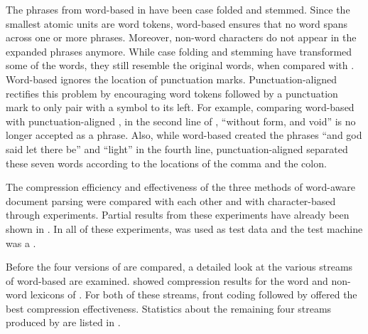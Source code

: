 The phrases from word-based \repair in 
 have been case folded and 
stemmed.  Since the smallest atomic units are word tokens, word-based
\repair ensures that no word spans across one or more phrases.
Moreover, non-word characters do not appear in 
the expanded phrases anymore.  While case folding and stemming have 
transformed some of the words, they still resemble the original words,
when compared with .  Word-based
\repair ignores the location of punctuation marks.  Punctuation-aligned
\repair rectifies this problem by encouraging word tokens followed by a
punctuation mark to only pair with a symbol to its left.
For example, comparing word-based \repair with punctuation-aligned 
\repair, in the second line of ,
``without form, and void'' is no longer accepted as a phrase.  Also,
while word-based \repair created the phrases ``and god said let there be''
and ``light'' in the fourth line, punctuation-aligned \repair separated
these seven words according to the locations of the comma and the colon.


The compression efficiency and effectiveness of 
the three methods of 
word-aware document parsing were compared with 
each other and with character-based 
\repair through experiments.
Partial results from these experiments have already been
shown in .  In all of
these experiments, \wsja was used as test data
and the test machine was a \vipe.

Before the four versions of \repair are compared, a detailed look
at the various streams of word-based \repair are examined.  
 showed compression results for
the word and non-word lexicons of \wsja.  For both of these 
streams, front coding followed by \bzip offered the best 
compression effectiveness.  Statistics about the remaining
four streams produced by \prepair are listed in 
.  

